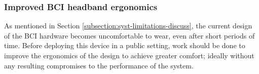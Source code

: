 \subsubsection{Improved BCI headband ergonomics}
As mentioned in Section \ref{subsection:syst-limitations-discuss}, the current design of the BCI hardware becomes uncomfortable to wear, even after short periods of time. Before deploying this device in a public setting, work should be done to improve the ergonomics of the design to achieve greater comfort; ideally without any resulting compromises to the performance of the system.